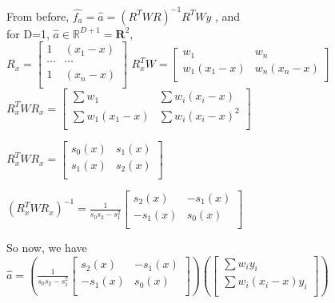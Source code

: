 \documentclass{homework}
\newcommand{\1}{\mathbf{1}}
\begin{document}
\begin{enumerate}[label=(\Alph*)]
\par From before, $\hat{f_a} = \hat{a} = (R^TWR)^{-1}R^TWy$ , and  \\for D=1, $\hat{a} \in \mathbb{R}^{D+1} = \mathbf{R}^2$,\\
$R_x = \begin{bmatrix}
       1 & (x_1 - x)        \\[0.3em]
       \cdots & \cdots    \\
       1 & (x_n - x)        \\[0.3em]
     \end{bmatrix}$
$R_x^TW = \begin{bmatrix}
       w_1 & w_n       \\[0.3em]
       w_1(x_1 - x) & w_n(x_n - x)        \\[0.3em]
     \end{bmatrix}$
\\$R_x^TWR_x = \begin{bmatrix}
       \sum w_1 & \sum w_i(x_i - x)       \\[0.3em]
       \sum w_1(x_1 - x) & \sum w_i(x_i - x)^2        \\[0.3em]
     \end{bmatrix}$
\\
\par
$R_x^TWR_x = \begin{bmatrix}
      s_0(x) & s_1(x)     \\[0.3em]
      s_1(x) & s_2(x)        \\[0.3em]
     \end{bmatrix}$
\\
\par
$(R_x^TWR_x)^{-1} = \frac{1}{s_0s_2 - s_1^2} 
\begin{bmatrix}  s_2(x) & -s_1(x) \\[0.3em]   -s_1(x) & s_0(x)  \\[0.3em]   \end{bmatrix}$

So now, we have $\hat{a} =  \left( \frac{1}{s_0s_2 - s_1^2}  
\begin{bmatrix}  s_2(x) & -s_1(x) \\[0.3em]   -s_1(x) & s_0(x)  \\[0.3em]   \end{bmatrix} \right) 
\left( \begin{bmatrix}  \sum w_iy_i \\[0.3em]  \sum w_i(x_i - x)y_i  \\[0.3em]  \end{bmatrix} \right)$


\end{enumerate}
\end{document}
